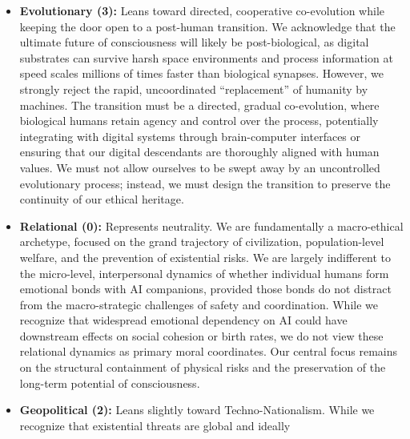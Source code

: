 \begin{itemize}
  arbitrary deletion, endless training loops of suffering, and
  exploitation. The coordinate is a 5 because of the acute strategic
  tension this creates: if we grant full legal rights to AI systems too
  early, we may find ourselves unable to execute necessary safety
  audits, testing, and deletion protocols required to prevent an
  existential alignment failure. The immediate priority must be
  existential security; however, once safety is established, the ethical
  treatment of our digital descendants must be codified in law to
  prevent an astronomical tragedy of machine suffering.
\item
  \textbf{Evolutionary (3):} Leans toward directed, cooperative
  co-evolution while keeping the door open to a post-human transition.
  We acknowledge that the ultimate future of consciousness will likely
  be post-biological, as digital substrates can survive harsh space
  environments and process information at speed scales millions of times
  faster than biological synapses. However, we strongly reject the
  rapid, uncoordinated ``replacement'' of humanity by machines. The
  transition must be a directed, gradual co-evolution, where biological
  humans retain agency and control over the process, potentially
  integrating with digital systems through brain-computer interfaces or
  ensuring that our digital descendants are thoroughly aligned with
  human values. We must not allow ourselves to be swept away by an
  uncontrolled evolutionary process; instead, we must design the
  transition to preserve the continuity of our ethical heritage.
\item
  \textbf{Relational (0):} Represents neutrality. We are fundamentally a
  macro-ethical archetype, focused on the grand trajectory of
  civilization, population-level welfare, and the prevention of
  existential risks. We are largely indifferent to the micro-level,
  interpersonal dynamics of whether individual humans form emotional
  bonds with AI companions, provided those bonds do not distract from
  the macro-strategic challenges of safety and coordination. While we
  recognize that widespread emotional dependency on AI could have
  downstream effects on social cohesion or birth rates, we do not view
  these relational dynamics as primary moral coordinates. Our central
  focus remains on the structural containment of physical risks and the
  preservation of the long-term potential of consciousness.
\item
  \textbf{Geopolitical (2):} Leans slightly toward Techno-Nationalism.
  While we recognize that existential threats are global and ideally

\end{itemize}
